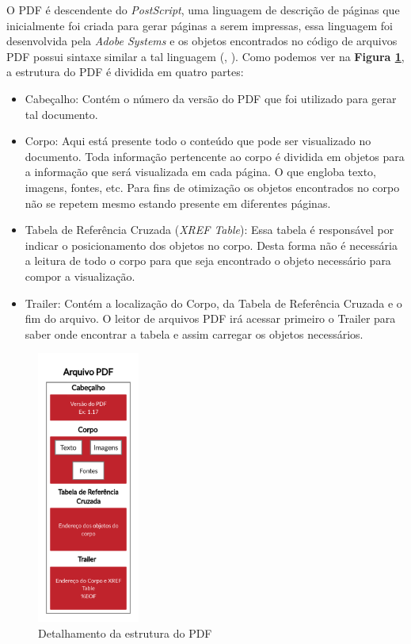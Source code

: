 O PDF é descendente do \textit{PostScript}, uma linguagem de descrição de páginas que inicialmente foi criada para gerar páginas a serem impressas, essa linguagem foi desenvolvida pela \textit{Adobe Systems} e os objetos encontrados no código de arquivos PDF possui sintaxe similar a tal linguagem (\citeauthor{preface2001pdf}, \citeyear{preface2001pdf}).  Como podemos ver na \textbf{Figura \ref{PDF_Structure}}, a estrutura do PDF é dividida em quatro partes: 

\begin{itemize}
    \item Cabeçalho: Contém o número da versão do PDF que foi utilizado para gerar tal documento.
    
    \item Corpo: Aqui está presente todo o conteúdo que pode ser visualizado no documento. Toda informação pertencente ao corpo é dividida em objetos para a informação que será visualizada em cada página. O que engloba texto, imagens, fontes, etc.
    Para fins de otimização os objetos encontrados no corpo não se repetem mesmo estando presente em diferentes páginas.
    
    \item Tabela de Referência Cruzada (\textit{XREF Table}): Essa tabela é responsável por indicar o posicionamento dos objetos no corpo. Desta forma não é necessária a leitura de todo o corpo para que seja encontrado o objeto necessário para compor a visualização.
    
    \item Trailer: Contém a localização do Corpo, da Tabela de Referência Cruzada e o fim do arquivo. O leitor de arquivos PDF irá acessar primeiro o Trailer para saber onde encontrar a tabela e assim carregar os objetos necessários.
\end{itemize}


\begin{figure}
\centering
\captionsetup{justification   = raggedright,
              singlelinecheck = false}
\caption{Detalhamento da estrutura do PDF}\label{PDF_Structure}
\includegraphics[width=0.3\textwidth]{figs/PDF.png}
\end{figure}

